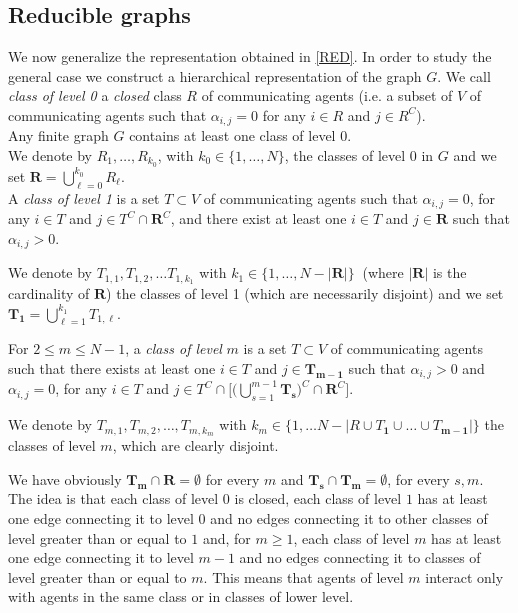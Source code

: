 \documentclass[article,12pt]{article}
\theoremstyle{plain}
\theoremstyle{definition}
\theoremstyle{remark}
\numberwithin{equation}{section}
\numberwithin{theorem}{section}
\begin{document}
		
		\subsection{Reducible graphs}
		
		We now generalize the representation obtained in \eqref{RED}.
		In order to study the general case we construct a hierarchical representation of the graph $G$. 
		We call \emph{class of level 0} a \emph{closed} class $R$ of communicating agents (i.e. a subset of $V$ of communicating agents such that $\alpha_{i,j}=0$ for any $i\in R$ and $j\in R^C$).\\
		Any finite graph $G$ contains at least one class of level 0.\\ 
		
		We denote by $R_1,\ldots, R_{k_0}$, with $k_0\in \{1,\ldots, N\}$, the classes of level 0 in $G$ and we set $\mathbf{R}=\bigcup_{\ell=0}^{k_0}R_\ell$.\\
		
		
		A \emph{class of level 1} is a set $T\subset V$ of communicating agents such that $\alpha_{i,j}=0$, for any $i\in T$ and $j\in T^C\cap \mathbf{R}^C$, and there exist at least one $i\in T$ and $j\in \mathbf{R}$ such that $\alpha_{i,j}>0$.  
		
		We denote by $T_{1,1}, T_{1,2},\ldots T_{1, k_1}$ with $k_1\in \{1, \ldots, N-|\mathbf{R}|\}\ $ (where $|\mathbf{R}|$ is the cardinality of $\mathbf{R}$) the classes of level 1 (which are necessarily disjoint) and we set $\mathbf{T_1}=\bigcup_{\ell=1}^{k_1}T_{1,\ell}$. 
		
		For $2\leq m\leq N-1$, a \emph{class of level} $m$ is a set $T\subset V$ of communicating agents such that there exists at least one $i\in T$ and $j\in \mathbf{T_{m-1}}$ such that $\alpha_{i,j}>0$ and $\alpha_{i,j}=0$, for any $i\in T$ and $j\in T^C\cap \big[\big(\bigcup_{s=1}^{m-1} \mathbf{T_s}\big)^C \cap  \mathbf{R}^C\big]$. 
		
		We denote by $T_{m, 1}, T_{m, 2}, \ldots, T_{m, k_m}$ with $k_m\in \{1, \ldots N-|R\cup T_{\mathbf{1}}\cup\ldots\cup T_{\mathbf{m-1}}|\}$
		the classes of level $m$, which are clearly disjoint. 
		
		We have obviously $\mathbf{T_{m}}\cap \mathbf{R}=\emptyset$ for every $m$ and $\mathbf{T_s}\cap \mathbf{T_m}=\emptyset$, for every $s, m$.\\
		
		The idea is that each class of level 0 is closed, each class of level $1$ has at least one edge connecting it to level 0 and no edges connecting it to other classes of level greater than or equal to $1$ and, for $m\geq 1$, each class of level $m$ has at least one edge connecting it to level $m-1$ and no edges connecting it to classes of level greater than or equal to $m$. This means that agents of level $m$ interact only with agents in the same class or in classes of lower level.     
		
\end{document}
